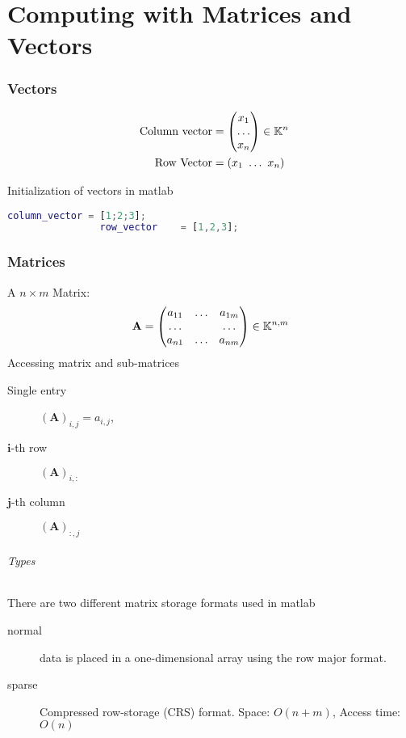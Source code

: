 \part{Computing with Matrices and Vectors}
	\section{Vectors}
			\begin{align*}
				\text{Column vector} &= \begin{pmatrix} x_1 \\
				                         \hdots\\
				                         x_n
				                        \end{pmatrix} \in \K^n \\
				\qquad \text{Row Vector} &= \left( x_1 \ \ldots \ x_n \right)
			\end{align*}

			Initialization of vectors in matlab
			\begin{lstlisting}[language=matlab]
				column_vector = [1;2;3];
				row_vector    = [1,2,3];
			\end{lstlisting}
		\section{Matrices}
			A $n \times m$ Matrix:
			\begin{align*}
			 \mathbf A = \begin{pmatrix}
			      a_{11} & \ldots 	& a_{1m}\\
			      \hdots & 			& \hdots\\
			      a_{n1} & \ldots 	& a_{nm}
			     \end{pmatrix} \in \mathbb{K}^{n,m}
			\end{align*}
			Accessing matrix and sub-matrices
			\begin{description}
			 \item[Single entry] $(\mathbf A)_{i,j} = a_{i,j}$, 
			 \item[$\mathbf i$-th row] $(\mathbf A)_{i,:}$
			 \item[$\mathbf j$-th column] $(\mathbf A)_{:,j}$
			\end{description}
			\paragraph{Types} There are two different matrix storage formats used in matlab
				\begin{description}
					\item[normal] data is placed in a one-dimensional array using the row major format.
					\item[sparse] Compressed row-storage (CRS) format. Space: $O(n+m)$, Access time: $O(n)$
				\end{description}


